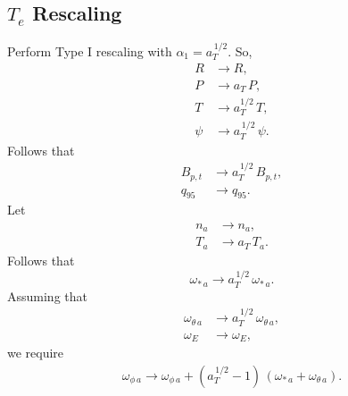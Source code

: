 \documentclass[12pt]{article}
\begin{document}
\subsection{$T_e$ Rescaling}
Perform Type I rescaling with $\alpha_1 =a_T^{\,1/2}$. So,
\begin{align}
R&\rightarrow R,\\[0.5ex]
P&\rightarrow a_T\,P,\\[0.5ex]
T&\rightarrow a_T^{1/2}\,T,\\[0.5ex]
\psi&\rightarrow a_T^{\,1/2}\,\psi.
\end{align}
Follows that
\begin{align}
B_{p,t}&\rightarrow a_T^{\,1/2}\,B_{p,t},\\[0.5ex]
q_{95}&\rightarrow q_{95}.
\end{align}
Let
\begin{align}
n_a&\rightarrow n_a,\\[0.5ex]
T_a&\rightarrow a_T\,T_a.
\end{align}
Follows that
\begin{equation}
\omega_{\ast\,a} \rightarrow a_T^{\,1/2}\,\omega_{\ast\,a}.
\end{equation}
Assuming that
\begin{align}
\omega_{\theta\,a}&\rightarrow a_T^{\,1/2}\,\omega_{\theta\,a},\\[0.5ex]
\omega_E&\rightarrow\omega_E,
\end{align}
we require 
\begin{align}
\omega_{\phi\,a}\rightarrow \omega_{\phi\,a}+(a_T^{\,1/2}-1)\,(\omega_{\ast\,a}+\omega_{\theta\,a}).
\end{align}
\end{document}
